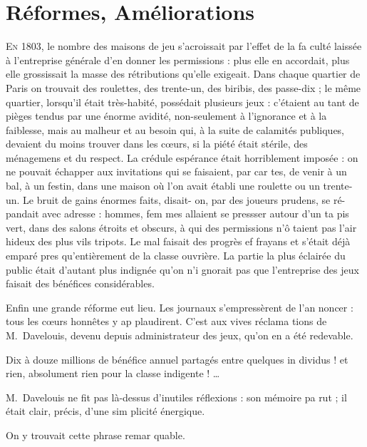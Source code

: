\chapter
  [Réformes, améliorations]
  {Réformes, Améliorations}

\lettrine{E}{n} 1803, le nombre des maisons de
jeu s'acroissait par l'effet de la fa%
culté laissée à l'entreprise générale
d'en donner les permissions : plus elle
en accordait, plus elle grossissait la
masse des rétributions qu'elle exigeait.
Dans chaque quartier de Paris on
trouvait des roulettes, des trente-un,
des biribis, des passe-dix ; le même
quartier, lorsqu'il était très-habité,
possédait plusieurs jeux : c'étaient au%
tant de pièges tendus par une énorme
avidité, non-seulement à l'ignorance
et à la faiblesse, mais au malheur et
au besoin qui, à la suite de calamités
publiques, devaient du moins trouver
dans les cœurs, si la piété était stérile,
des ménagemens et du respect. La
crédule espérance était horriblement
imposée : on ne pouvait échapper aux
invitations qui se faisaient, par car%
tes, de venir à un bal, à un festin,
dans une maison où l'on avait établi
une roulette ou un trente-un. Le
bruit de gains énormes faits, disait-%
on, par des joueurs prudens, se ré-%
pandait avec adresse : hommes, fem%
mes allaient se pressser autour d'un ta%
pis vert, dans des salons étroits et
obscurs, à qui des permissions n'ô%
taient pas l'air hideux des plus vils
tripots. Le mal faisait des progrès ef%
frayans et s'était déjà emparé pres%
qu'entièrement de la classe ouvrière.
La partie la plus éclairée du public
était d'autant plus indignée qu'on n'i%
gnorait pas que l'entreprise des jeux
faisait des bénéfices considérables.

Enfin une grande réforme eut lieu.
Les journaux s'empressèrent de l'an%
noncer : tous les cœurs honnêtes y ap%
plaudirent. C'est aux vives réclama%
tions de M.~Davelouis, devenu depuis
administrateur des jeux, qu'on en a 
été redevable.

Dix à douze millions de bénéfice
annuel partagés entre quelques in%
dividus ! et rien, absolument rien pour
la classe indigente ! \ldots

M.~Davelouis ne fit pas là-dessus
d'inutiles réflexions : son mémoire pa%
rut ; il était clair, précis, d'une sim%
plicité énergique.

On y trouvait cette phrase remar%
quable.

